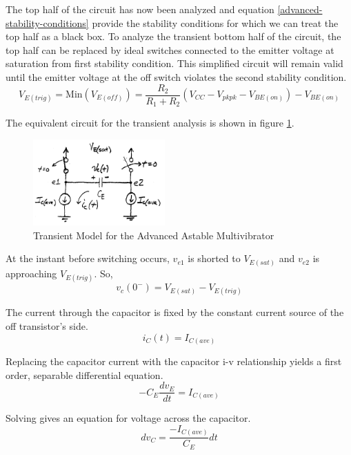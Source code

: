 \documentclass[titlepage, letterpaper, 10.5pt]{article}
\begin{document}
The top half of the circuit has now been analyzed and equation
\ref{advanced-stability-conditions} provide the stability conditions for
which we can treat the top half as a black box. To analyze the transient
bottom half of the circuit, the top half can be replaced by ideal switches
connected to the emitter voltage at saturation from first stability condition.
This simplified circuit will remain valid until the emitter voltage at the off
switch violates the second stability condition.
\begin{equation}
V_{E(trig)}=\textrm{Min}(V_{E(off)})=\frac{R_{2}}{R_{1}+R_{2}}(V_{CC}-V_{pkpk}-V_{BE(on)})-V_{BE(on)}
\end{equation}

The equivalent circuit for the transient analysis is shown in figure
\ref{advanced-transient-circuit}.

\begin{figure}[ht]
	\centering
	\includegraphics[width=0.45\textwidth]{diagrams/advanced-transient-circuit}
	\caption{Transient Model for the Advanced Astable Multivibrator}
	\label{advanced-transient-circuit}
\end{figure}

At the instant before switching occurs, $v_{e1}$ is shorted to $V_{E(sat)}$ and
$v_{e2}$ is approaching $V_{E(trig)}$. So,
\begin{equation}
v_{c}(0^{-})=V_{E(sat)}-V_{E(trig)}
\label{advanced-initial-condition}
\end{equation}

The current through the capacitor is fixed by the constant current source
of the off transistor's side.
\begin{equation*}
i_{C}(t)=I_{C(ave)}
\end{equation*}

Replacing the capacitor current with the capacitor i-v relationship yields
a first order, separable differential equation.
\begin{equation*}
-C_{E}\frac{dv_{E}}{dt}=I_{C(ave)}
\end{equation*}

Solving gives an equation for voltage across the capacitor.
\begin{equation*}
dv_{C}=\frac{-I_{C(ave)}}{C_{E}}dt
\end{equation*}
\end{document}
